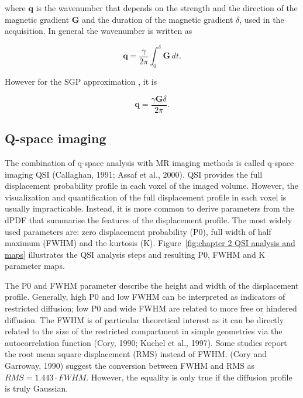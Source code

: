 where $\textbf{q}$ is the wavenumber that depends on the strength and the direction of the magnetic gradient $\textbf{G}$ and the duration of the magnetic gradient $\delta$, used in the acquisition. In general the wavenumber is written as

\begin{equation}
\textbf{q}=\frac{\gamma}{2\pi}\int^\delta_0 \textbf{G}\,dt.
\label{q}
\end{equation}

However for the SGP approximation  \cite{Price1}, it is

 \begin{equation}
\textbf{q}=\frac{\gamma \textbf{G}\delta}{2\pi}.
\label{qsgp}
\end{equation}

\subsection{Q-space imaging}
\label{sec:qspace}
The combination of q-space analysis with MR imaging methods is called q-space imaging \gls{QSI} (Callaghan, 1991; Assaf et al., 2000). \gls{QSI} provides the full displacement probability profile in each voxel of the imaged volume. However, the visualization and quantification of the full displacement profile in each voxel is usually impracticable. Instead, it is more common to derive parameters from the dPDF that summarise the features of the displacement profile. The most widely used parameters are: zero displacement probability (P0), full width of half maximum (FWHM) and the kurtosis (K). Figure~\ref{fig:chapter 2 QSI analysis and maps} illustrates the QSI analysis steps and resulting P0, FWHM and K parameter maps.

The P0 and FWHM parameter describe the height and width of the displacement profile. Generally, high P0 and low FWHM can be interpreted as indicators of restricted diffusion; low P0 and wide FWHM are related to more free or hindered diffusion. The FWHM is of particular theoretical interest as it can be directly related to the size of the restricted compartment in simple geometries via the autocorrelation function (Cory, 1990; Kuchel et al., 1997). Some studies report the root mean square displacement (RMS) instead of FWHM. (Cory and Garroway, 1990) suggest the conversion between FWHM and RMS as $RMS = 1.443 \cdot FWHM$. However, the equality is only true if the diffusion profile is truly Gaussian.


